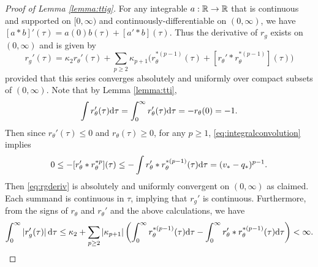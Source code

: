 \begin{proof}[Proof of Lemma \ref{lemma:ttig}]
For any integrable $a:\mathbb{R} \to \mathbb{R}$ that is continuous and supported on
$[0,\infty)$ and continuously-differentiable on $(0,\infty)$,
we have $[a*b]'(\tau)=a(0)b(\tau)+[a'*b](\tau)$. Thus
the derivative of $r_g$ exists on $(0,\infty)$ and is given by 
\begin{equation}\label{eq:rgderiv}
r_g'(\tau)=\kappa_2r_\theta'(\tau)+\sum_{p \geq 2} \kappa_{p+1}
\Big(r_\theta^{*(p-1)}(\tau)+[r_\theta'*r_\theta^{*(p-1)}](\tau)\Big)
\end{equation}
provided that this series converges absolutely and uniformly over
compact subsets of $(0,\infty)$. Note that by Lemma \ref{lemma:tti},
\[\int r_\theta'(\tau)\mathrm{d} \tau
=\int_0^\infty r_\theta'(\tau)\mathrm{d} \tau={-}r_\theta(0)=-1.\]
Then since $r_\theta'(\tau) \leq 0$ and $r_\theta(\tau) \geq 0$,
for any $p \geq 1$, \eqref{eq:integralconvolution} implies
\begin{align*}
0 \leq {-}[r_\theta'*r_\theta^{*p}](\tau)
\leq -\int r_\theta'*r_\theta^{*(p-1)}(\tau)\mathrm{d}\tau
=(v_*-q_*)^{p-1}.
\end{align*}
Then \eqref{eq:rgderiv} is absolutely
and uniformly convergent on $(0,\infty)$ as claimed.
Each summand is continuous in $\tau$, implying 
that $r_g'$ is continuous. Furthermore, from the
signs of $r_\theta$ and $r_\theta'$ and the above calculations, we have
\[\int_0^\infty |r_g'(\tau)|\,\mathrm{d} \tau
\leq \kappa_2+\sum_{p \geq 2} |\kappa_{p+1}|
\left(\int_0^\infty r_\theta^{*(p-1)}(\tau)\mathrm{d}\tau
-\int_0^\infty r_\theta'*r_\theta^{*(p-1)}(\tau)\mathrm{d} \tau\right)<\infty.\]


\end{proof}
